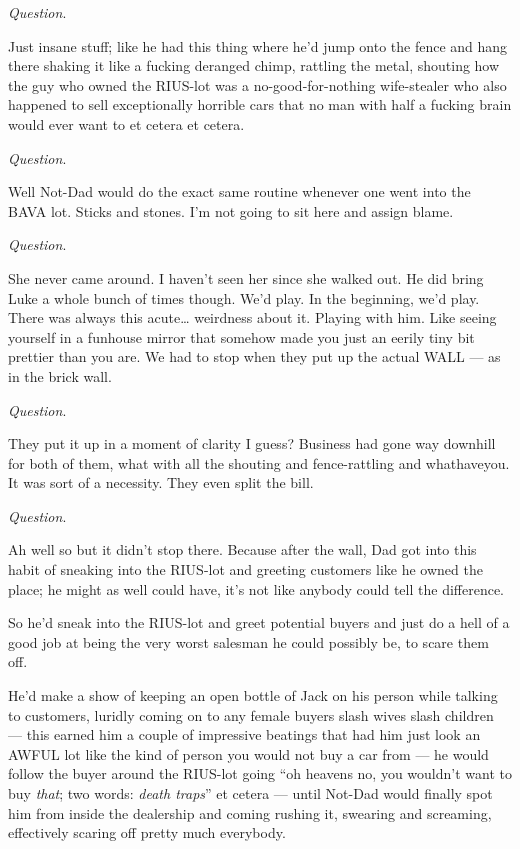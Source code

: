 {\em Question}.



Just insane stuff; like he had this thing where he'd jump
onto the fence and hang there shaking it like a fucking deranged
chimp, rattling the metal, shouting how the guy who owned the
RIUS-lot was a no-good-for-nothing wife-stealer who also happened
to sell exceptionally horrible cars that no man with half a fucking
brain would ever want to et cetera et cetera.



{\em Question}.



Well Not-Dad would do the exact same routine whenever one went into
the BAVA lot. Sticks and stones. I'm not going to sit here and
assign blame.



{\em Question}.



She never came around. I haven't seen her since she walked
out. He did bring Luke a whole bunch of times though. We'd
play. In the beginning, we'd play. There was always this
acute{\ldots} weirdness about it. Playing with him. Like seeing
yourself in a funhouse mirror that somehow made you just an eerily
tiny bit prettier than you are. We had to stop when they put up the
actual WALL --- as in the brick wall.



{\em Question}.



They put it up in a moment of clarity I guess? Business had gone
way downhill for both of them, what with all the shouting and
fence-rattling and whathaveyou. It was sort of a necessity. They
even split the bill.



{\em Question}.



Ah well so but it didn't stop there. Because after the wall,
Dad got into this habit of sneaking into the RIUS-lot and greeting
customers like he owned the place; he might as well could have,
it's not like anybody could tell the difference.

So he'd sneak into the RIUS-lot and greet potential buyers
and just do a hell of a good job at being the very worst salesman
he could possibly be, to scare them off.

He'd make a show of keeping an open bottle of Jack on his person while
talking to customers, luridly coming on to any female buyers slash wives
slash children --- this earned him a couple of impressive beatings that
had him just look an AWFUL lot like the kind of person you would not buy
a car from --- he would follow the buyer around the RIUS-lot going ``oh
heavens no, you wouldn't want to buy {\em that}; two words: {\em death
  traps}'' et cetera --- until Not-Dad would finally spot him from
inside the dealership and coming rushing it, swearing and screaming,
effectively scaring off pretty much everybody.

